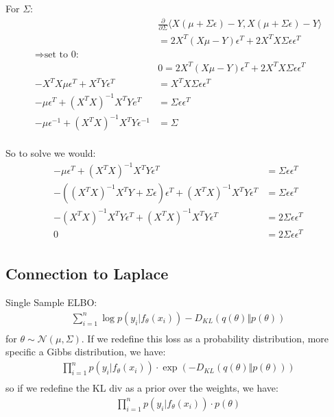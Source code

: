\documentclass[a4paper]{scrartcl}
\begin{document}
    
    For $\Sigma$:
    \begin{align*}
      &\frac{\partial}{\partial \Sigma}\langle X (\mu + \Sigma \epsilon) - Y, X (\mu + \Sigma \epsilon) -Y \rangle\\
      &= 2X^T(X \mu  - Y) \epsilon^T + 2 X^T X \Sigma \epsilon \epsilon^T\\
      \Rightarrow \text{set to 0:}\\
      &0 = 2X^T(X \mu  - Y) \epsilon^T + 2 X^T X \Sigma \epsilon \epsilon^T\\
      - X^T X \mu \epsilon^T +  X^T Y \epsilon^T &= X^T X \Sigma \epsilon \epsilon^T\\
      -\mu \epsilon^T + (X^T X)^{-1} X^T Y e^T &= \Sigma \epsilon \epsilon^T\\
      -\mu \epsilon^{-1} + (X^T X)^{-1} X^T Y \epsilon^{-1}&= \Sigma\\ %
    \end{align*}

    So to solve we would:
    \begin{align}
      -\mu \epsilon^T + (X^T X)^{-1} X^T Y \epsilon^T &= \Sigma \epsilon \epsilon^T\\
      - ((X^T X)^{-1} X^T Y + \Sigma \epsilon) \epsilon^T + (X^T X)^{-1} X^T Y \epsilon^T &= \Sigma \epsilon \epsilon^T\\
      - (X^T X)^{-1} X^T Y \epsilon^T + (X^T X)^{-1} X^T Y \epsilon^T &= 2\Sigma \epsilon \epsilon^T\\
      0 &= 2\Sigma \epsilon \epsilon^T\\
    \end{align}


    \subsection{Connection to Laplace}
    Single Sample ELBO:
    \begin{align*}
      \sum_{i=1}^n \log{p(y_i \vert f_{\theta}(x_i))} - D_{KL}(q(\theta) \Vert p(\theta))\\
    \end{align*}
    for $\theta \sim \mathcal{N}(\mu,\Sigma)$.
    If we redefine this loss as a probability distribution, more specific a Gibbs distribution, we have:
    \begin{align*}
      \prod_{i=1}^n p(y_i \vert f_{\theta}(x_i)) \cdot \exp(- D_{KL}(q(\theta) \Vert p(\theta)))\\
    \end{align*}
    so if we redefine the KL div as a prior over the weights, we have:
    \begin{align*}
      \prod_{i=1}^n p(y_i \vert f_{\theta}(x_i)) \cdot p(\theta)\\
    \end{align*}
\end{document}
